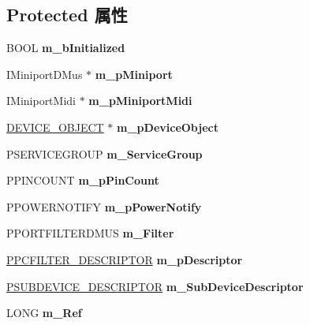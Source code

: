 \subsection*{Protected 属性}
\begin{DoxyCompactItemize}
\item 
\mbox{\label{class_c_port_d_mus_a3937a72806bb1e1216af8803bb72e506}} 
B\+O\+OL {\bfseries m\+\_\+b\+Initialized}
\item 
\mbox{\label{class_c_port_d_mus_ac095d6a1290e791138de9fa73acd259b}} 
I\+Miniport\+D\+Mus $\ast$ {\bfseries m\+\_\+p\+Miniport}
\item 
\mbox{\label{class_c_port_d_mus_a9b87edb8453958f1391d3077dede68e5}} 
I\+Miniport\+Midi $\ast$ {\bfseries m\+\_\+p\+Miniport\+Midi}
\item 
\mbox{\label{class_c_port_d_mus_a89a4ad916f2be6a8ccfe5b8e78bc0af4}} 
\hyperlink{struct___d_e_v_i_c_e___o_b_j_e_c_t}{D\+E\+V\+I\+C\+E\+\_\+\+O\+B\+J\+E\+CT} $\ast$ {\bfseries m\+\_\+p\+Device\+Object}
\item 
\mbox{\label{class_c_port_d_mus_aa60854090d6ea49f182df42cda831763}} 
P\+S\+E\+R\+V\+I\+C\+E\+G\+R\+O\+UP {\bfseries m\+\_\+\+Service\+Group}
\item 
\mbox{\label{class_c_port_d_mus_af7b7ad0bddde60d4877a7c093fcc989a}} 
P\+P\+I\+N\+C\+O\+U\+NT {\bfseries m\+\_\+p\+Pin\+Count}
\item 
\mbox{\label{class_c_port_d_mus_ae0917e72c4371988f1aac5c7741c7577}} 
P\+P\+O\+W\+E\+R\+N\+O\+T\+I\+FY {\bfseries m\+\_\+p\+Power\+Notify}
\item 
\mbox{\label{class_c_port_d_mus_a06aea4c4d2310751841ab1c30890bacd}} 
P\+P\+O\+R\+T\+F\+I\+L\+T\+E\+R\+D\+M\+US {\bfseries m\+\_\+\+Filter}
\item 
\mbox{\label{class_c_port_d_mus_acc744d52e1800157945e9e3c934060e6}} 
\hyperlink{struct_p_c_f_i_l_t_e_r___d_e_s_c_r_i_p_t_o_r}{P\+P\+C\+F\+I\+L\+T\+E\+R\+\_\+\+D\+E\+S\+C\+R\+I\+P\+T\+OR} {\bfseries m\+\_\+p\+Descriptor}
\item 
\mbox{\label{class_c_port_d_mus_a2938568276a0ddb3abfa1b430061c3bf}} 
\hyperlink{struct_s_u_b_d_e_v_i_c_e___d_e_s_c_r_i_p_t_o_r}{P\+S\+U\+B\+D\+E\+V\+I\+C\+E\+\_\+\+D\+E\+S\+C\+R\+I\+P\+T\+OR} {\bfseries m\+\_\+\+Sub\+Device\+Descriptor}
\item 
\mbox{\label{class_c_port_d_mus_aad88d8b9c1584a36028aacee3b9d9529}} 
L\+O\+NG {\bfseries m\+\_\+\+Ref}
\end{DoxyCompactItemize}
